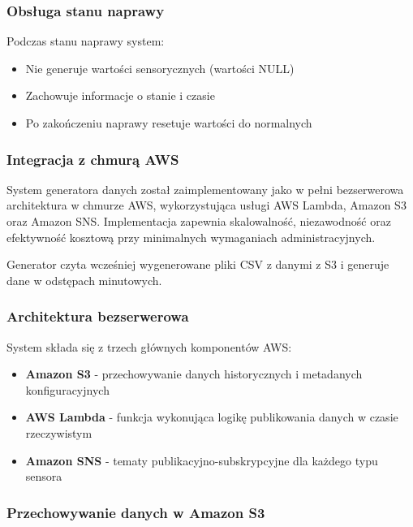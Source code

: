 \subsubsection{Obsługa stanu naprawy}

Podczas stanu naprawy system:
\begin{itemize}
    \item Nie generuje wartości sensorycznych (wartości NULL)
    \item Zachowuje informacje o stanie i czasie
    \item Po zakończeniu naprawy resetuje wartości do normalnych
\end{itemize}

\subsubsection{Integracja z chmurą AWS}
\label{sec:integracja_aws}

System generatora danych został zaimplementowany jako w pełni bezserwerowa architektura w chmurze AWS, wykorzystująca usługi AWS Lambda, Amazon S3 oraz Amazon SNS. Implementacja zapewnia skalowalność, niezawodność oraz efektywność kosztową przy minimalnych wymaganiach administracyjnych.

Generator czyta wcześniej wygenerowane pliki CSV z danymi z S3 i generuje dane w odstępach minutowych.

\subsubsection{Architektura bezserwerowa}
\label{subsec:architektura_bezserwerowa}

System składa się z trzech głównych komponentów AWS:

\begin{itemize}
    \item \textbf{Amazon S3} - przechowywanie danych historycznych i metadanych konfiguracyjnych
    \item \textbf{AWS Lambda} - funkcja wykonująca logikę publikowania danych w czasie rzeczywistym
    \item \textbf{Amazon SNS} - tematy publikacyjno-subskrypcyjne dla każdego typu sensora
\end{itemize}

\subsubsection{Przechowywanie danych w Amazon S3}
\label{subsec:amazon_s3}

